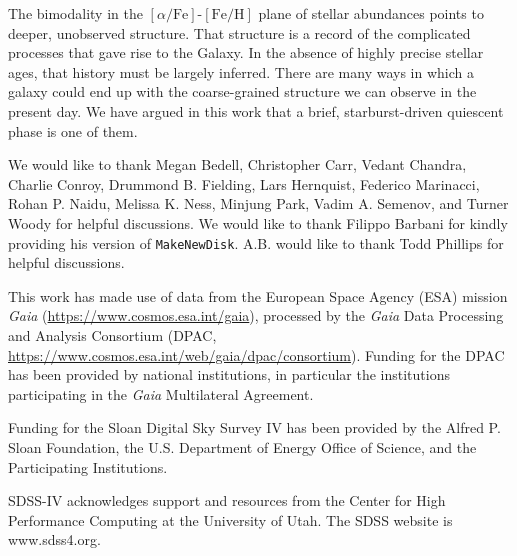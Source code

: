\documentclass[twocolumn,linenumbers,trackchanges]{aastex631}
\newcommand{\FeH}{\ensuremath{[\textrm{Fe}/\textrm{H}]}}
\newcommand{\alphaFe}{\ensuremath{[\alpha/\textrm{Fe}]}}
\begin{document}
The bimodality in the \alphaFe{}-\FeH{} plane of stellar abundances points to deeper, unobserved structure. That structure is a record of the complicated processes that gave rise to the Galaxy. In the absence of highly precise stellar ages, that history must be largely inferred. There are many ways in which a galaxy could end up with the coarse-grained structure we can observe in the present day. We have argued in this work that a brief, starburst-driven quiescent phase is one of them.

\begin{acknowledgements}
We would like to thank Megan Bedell, Christopher Carr, Vedant Chandra, Charlie Conroy, Drummond B. Fielding, Lars Hernquist, Federico Marinacci, Rohan P. Naidu, Melissa K. Ness, Minjung Park, Vadim A. Semenov, and Turner Woody for helpful discussions. We would like to thank Filippo Barbani for kindly providing his version of \texttt{MakeNewDisk}. A.B. would like to thank Todd Phillips for helpful discussions.

This work has made use of data from the European Space Agency (ESA) mission {\it Gaia} (\url{https://www.cosmos.esa.int/gaia}), processed by the {\it Gaia} Data Processing and Analysis Consortium (DPAC, \url{https://www.cosmos.esa.int/web/gaia/dpac/consortium}). Funding for the DPAC has been provided by national institutions, in particular the institutions participating in the {\it Gaia} Multilateral Agreement.

Funding for the Sloan Digital Sky 
Survey IV has been provided by the 
Alfred P. Sloan Foundation, the U.S. 
Department of Energy Office of 
Science, and the Participating 
Institutions. 

SDSS-IV acknowledges support and 
resources from the Center for High 
Performance Computing  at the 
University of Utah. The SDSS 
website is www.sdss4.org.


\end{acknowledgements}
\end{document}

